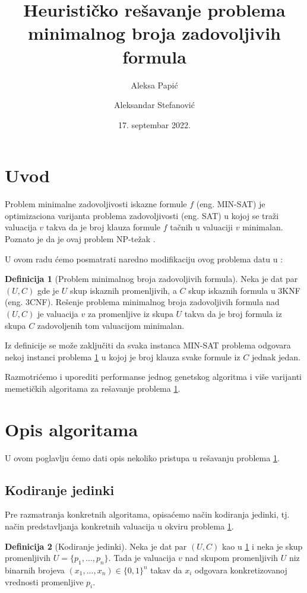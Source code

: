 \documentclass[12pt, a4paper]{article}
\title{Heurističko rešavanje problema minimalnog broja zadovoljivih formula}
\author{
	Aleksa Papić
	\and
	Aleksandar Stefanović
}
\date{17. septembar 2022.}
\theoremstyle{definition}
\newtheorem{definition}{Definicija}[section]
\begin{document}
\maketitle

\tableofcontents

\section{Uvod}

Problem minimalne zadovoljivosti iskazne formule $f$ (eng. MIN-SAT) je optimizaciona varijanta problema zadovoljivosti (eng. SAT) u kojoj se traži valuacija $v$ takva da je broj klauza formule $f$ tačnih u valuaciji $v$ minimalan. Poznato je da je ovaj problem NP-težak \cite{1}.

U ovom radu ćemo posmatrati naredno modifikaciju ovog problema datu u \cite{2}:
\begin{definition}[Problem minimalnog broja zadovoljivih formula]
\label{def 1.1}
Neka je dat par $(U, C)$ gde je $U$ skup iskaznih promenljivih, a $C$ skup iskaznih formula u 3KNF (eng. 3CNF). Rešenje problema minimalnog broja zadovoljivih formula nad $(U, C)$ je valuacija $v$ za promenljive iz skupa $U$ takva da je broj formula iz skupa $C$ zadovoljenih tom valuacijom minimalan.
\end{definition}

Iz definicije se može zaključiti da svaka instanca MIN-SAT problema odgovara nekoj instanci problema \ref{def 1.1} u kojoj je broj klauza svake formule iz $C$ jednak jedan.

Razmotrićemo i uporediti performanse jednog genetskog algoritma i više varijanti memetičkih algoritama za rešavanje problema \ref{def 1.1}.

\section{Opis algoritama}

U ovom poglavlju ćemo dati opis nekoliko pristupa u rešavanju problema \ref{def 1.1}.

\subsection{Kodiranje jedinki}

Pre razmatranja konkretnih algoritama, opisaćemo način kodiranja jedinki, tj. način predstavljanja konkretnih valuacija u okviru problema \ref{def 1.1}.

\begin{definition}[Kodiranje jedinki]
\label{def 2.1}
Neka je dat par $(U, C)$ kao u \ref{def 1.1} i neka je skup promenljivih $U = \{p_1, ..., p_n\}$. Tada je valuacija $v$ nad skupom promenljivih $U$ niz binarnih brojeva $(x_1, ..., x_n) \in \{0, 1\}^n$ takav da $x_i$ odgovara konkretizovanoj vrednosti promenljive $p_i$.
\end{definition}
\end{document}
